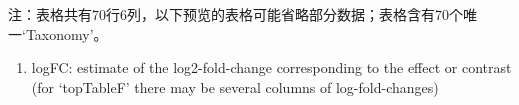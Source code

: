 \documentclass[
]{article}
\providecommand{\tightlist}{%
  \setlength{\itemsep}{0pt}\setlength{\parskip}{0pt}}
\begin{document}
\begin{center}\begin{tcolorbox}[colback=gray!10, colframe=gray!50, width=0.9\linewidth, arc=1mm, boxrule=0.5pt]注：表格共有70行6列，以下预览的表格可能省略部分数据；表格含有70个唯一`Taxonomy'。
\end{tcolorbox}
\end{center}
\begin{center}\begin{tcolorbox}[colback=gray!10, colframe=gray!50, width=0.9\linewidth, arc=1mm, boxrule=0.5pt]\begin{enumerate}\tightlist
\item logFC:  estimate of the log2-fold-change corresponding to the effect or contrast (for ‘topTableF’ there may be several columns of log-fold-changes)
\end{enumerate}\end{tcolorbox}
\end{center}
\end{document}

